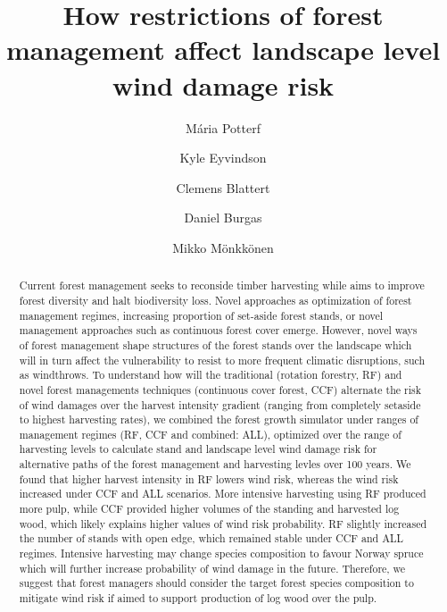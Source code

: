 \documentclass[]{elsarticle} %
\begin{document}
\begin{frontmatter}

  \title{How restrictions of forest management affect landscape level wind damage
risk}
    \author[Department of Biological and Environmental Science]{Mária Potterf}
    \author[Department of Biological and Environmental Science]{Kyle Eyvindson}
    \author[Department of Biological and Environmental Science]{Clemens Blattert}
    \author[Department of Biological and Environmental Science]{Daniel Burgas}
    \author[Department of Biological and Environmental Science]{Mikko Mönkkönen}
      \address[University of Jyvaskyla]{Department of Biological and Environmental Science, University of
Jyvaskyla, P.O. Box 35, FI-40014 Jyvaskyla, Finland}
    \address[Wisdom]{This is wisdom address}
    \address[LUKE]{THIS is Luke address Department, Street, City, State, Zip}
    \cortext[]{}
  
  \begin{abstract}
  Current forest management seeks to reconside timber harvesting while
  aims to improve forest diversity and halt biodiversity loss. Novel
  approaches as optimization of forest management regimes, increasing
  proportion of set-aside forest stands, or novel management approaches
  such as continuous forest cover emerge. However, novel ways of forest
  management shape structures of the forest stands over the landscape
  which will in turn affect the vulnerability to resist to more frequent
  climatic disruptions, such as windthrows. To understand how will the
  traditional (rotation forestry, RF) and novel forest managements
  techniques (continuous cover forest, CCF) alternate the risk of wind
  damages over the harvest intensity gradient (ranging from completely
  setaside to highest harvesting rates), we combined the forest growth
  simulator under ranges of management regimes (RF, CCF and combined:
  ALL), optimized over the range of harvesting levels to calculate stand
  and landscape level wind damage risk for alternative paths of the forest
  management and harvesting levles over 100 years. We found that higher
  harvest intensity in RF lowers wind risk, whereas the wind risk
  increased under CCF and ALL scenarios. More intensive harvesting using
  RF produced more pulp, while CCF provided higher volumes of the standing
  and harvested log wood, which likely explains higher values of wind risk
  probability. RF slightly increased the number of stands with open edge,
  which remained stable under CCF and ALL regimes. Intensive harvesting
  may change species composition to favour Norway spruce which will
  further increase probability of wind damage in the future. Therefore, we
  suggest that forest managers should consider the target forest species
  composition to mitigate wind risk if aimed to support production of log
  wood over the pulp.
  \end{abstract}
  
 \end{frontmatter}
\end{document}
